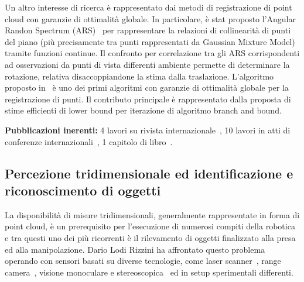 \documentclass[11pt]{article}
\begin{document}
Un altro interesse di ricerca \`e rappresentato dai metodi di registrazione di point cloud con garanzie di ottimalit\`a globale. 
In particolare, \`e stat proposto l'Angular Randon Spectrum (ARS)~\cite{lodirizzini2018pr} per rappresentare la relazioni di collinearit\`a di punti del piano (pi\`u precisamente tra punti rappresentati da Gaussian Mixture Model) tramite funzioni continue. 
Il confronto per correlazione tra gli ARS corrispondenti ad osservazioni da punti di vista differenti ambiente permette di determinare la rotazione, relativa disaccoppiandone la stima dalla traslazione. 
L'algoritmo proposto in~\cite{consolini2020pr} \`e uno dei primi algoritmi con garanzie di ottimalit\`a globale per la registrazione di punti. 
Il contributo principale \`e rappresentato dalla proposta di stime efficienti di lower bound per iterazione di algoritmo branch and bound.

\textbf{Pubblicazioni inerenti:}
4 lavori su rivista internazionale~\cite{lodirizzini2019ral, lodirizzini2018pr, kallasi2016ral, lodirizzini2009ras},
10 lavori in atti di conferenze internazionali~\cite{
lodirizzini2018irosws, lodirizzini2017iros, kallasi2016iros, lodirizzini2011icra, lodirizzini2010iros, lodirizzini2010graphbot,
lodirizzini2009iros, lodirizzini2009ecmr, lodirizzini2009icar, grisetti2008icra},
1 capitolo di libro~\cite{lodirizzini2008improved}.

\subsection*{Percezione tridimensionale ed identificazione e riconoscimento di oggetti}

La disponibilit\`a di misure tridimensionali, generalmente rappresentate in forma di point cloud, \`e un prerequisito per l'esecuzione 
di numerosi compiti della robotica e tra questi uno dei pi\`u ricorrenti \`e il rilevamento di oggetti finalizzato alla presa ed alla manipolazione. 
Dario Lodi Rizzini ha affrontato questo problema operando con sensori basati su diverse tecnologie, come laser scanner~\cite{aleotti2014jirs,aleotti2012icra},
range camera~\cite{chiaravalli2020etfa, aleotti2014iros, lodirizzini2014ias}, visione monoculare e stereoscopica~\cite{lodirizzini2017caee, lodirizzini2015ijars,
oleari2014ifac, oleari2013iccp} ed in setup sperimentali differenti.
\end{document}
